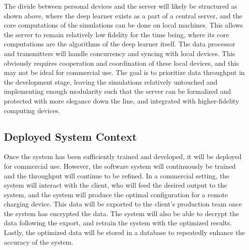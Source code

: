 \documentclass[12pt, titlepage]{article}
\begin{document}
The divide between personal devices and the server will likely be structured as shown above, where the deep learner exists as a part of a central server, and the core computations of the simulations can be done on local machines. This allows the server to remain relatively low fidelity for the time being, where its core computations are the algorithms of the deep learner itself. The data processor and transmitters will handle concurrency and syncing with local devices. This obviously requires cooperation and coordination of these local devices, and this may not be ideal for commercial use. The goal is to prioritize data throughput in the development stage, leaving the simulations relatively untouched and implementing enough modularity such that the server can be formalized and protected with more elegance down the line, and integrated with higher-fidelity computing devices.

\subsection{Deployed System Context}
Once the system has been sufficiently trained and developed, it will be deployed for commercial use. However, the software system will continuously be trained and the throughput will continue to be refined. In a commercial setting, the system will interact with the client, who will feed the desired output to the system, and the system will produce the optimal configuration for a remote charging device. This data will be exported to the client's production team once the system has encrypted the data. The system will also be able to decrypt the data following the export, and retrain the system with the optimized results. Lastly, the optimized data will be stored in a database to repeatedly enhance the accuracy of the system.
\newpage
\end{document}
